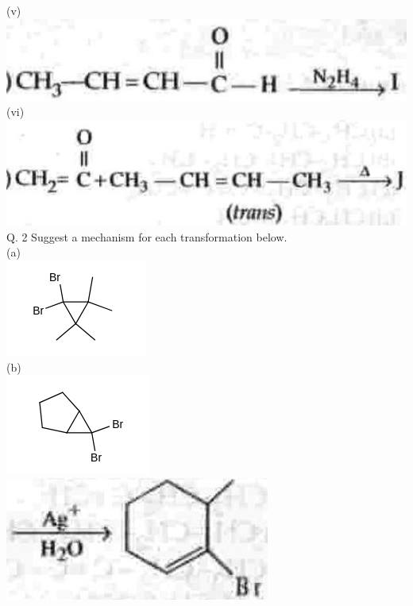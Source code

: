 \documentclass[10pt]{article}
\begin{document}
(v)\\
\includegraphics[max width=\textwidth, center]{2025_01_28_8470952b98110cec3aabg-238(7)}\\
(vi)\\
\includegraphics[max width=\textwidth, center]{2025_01_28_8470952b98110cec3aabg-238(9)}\\
Q. 2 Suggest a mechanism for each transformation below.\\
(a)\\
\includegraphics{smile-34de08cf6e54d912c2b95afa29b092f95007cf93}\\
(b)\\
\includegraphics{smile-97c5888a606f7ac2fcd0bcd85f99accaddca9d00}\\
\includegraphics[max width=\textwidth, center]{2025_01_28_8470952b98110cec3aabg-238(2)}\\
\end{document}
